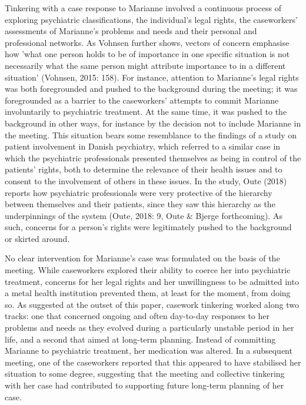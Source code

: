 Tinkering with a case response to Marianne involved a continuous process of exploring psychiatric classifications, the individual’s legal rights, the caseworkers’ assessments of Marianne’s problems and needs and their personal and professional networks. As Vohnsen further shows, vectors of concern emphasise how 'what one person holds to be of importance in one specific situation is not necessarily what the same person might attribute importance to in a different situation' (Vohnsen, 2015: 158). For instance, attention to Marianne’s legal rights was both foregrounded and pushed to the background during the meeting; it was foregrounded as a barrier to the caseworkers’ attempts to commit Marianne involuntarily to psychiatric treatment. At the same time, it was pushed to the background in other ways, for instance by the decision not to include Marianne in the meeting. This situation bears some resemblance to the findings of a study on patient involvement in Danish psychiatry, which referred to a similar case in which the psychiatric professionals presented themselves as being in control of the patients’ rights, both to determine the relevance of their health issues and to consent to the involvement of others in these issues. In the study, Oute (2018) reports how psychiatric professionals were very protective of the hierarchy between themselves and their patients, since they saw this hierarchy as the underpinnings of the system (Oute, 2018: 9, Oute \& Bjerge forthcoming). As such, concerns for a person’s rights were legitimately pushed to the background or skirted around.
\par
No clear intervention for Marianne’s case was formulated on the basis of the meeting. While caseworkers explored their ability to coerce her into psychiatric treatment, concerns for her legal rights and her unwillingness to be admitted into a metal health institution prevented them, at least for the moment, from doing so. As suggested at the outset of this paper, casework tinkering worked along two tracks: one that concerned ongoing and often day-to-day responses to her problems and needs as they evolved during a particularly unstable period in her life, and a second that aimed at long-term planning. Instead of committing Marianne to psychiatric treatment, her medication was altered. In a subsequent meeting, one of the caseworkers reported that this appeared to have stabilised her situation to some degree, suggesting that the meeting and collective tinkering with her case had contributed to supporting future long-term planning of her case. 

